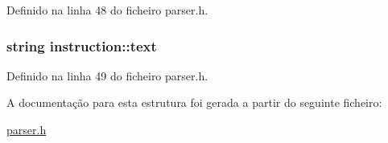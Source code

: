 Definido na linha 48 do ficheiro parser.\-h.

\hypertarget{structinstruction_af31af10ecfe7d2fdf154616d0aede8ea}{
\subsubsection[{text}]{\setlength{\rightskip}{0pt plus 5cm}string instruction\-::text}}\label{structinstruction_af31af10ecfe7d2fdf154616d0aede8ea}


Definido na linha 49 do ficheiro parser.\-h.



A documentação para esta estrutura foi gerada a partir do seguinte ficheiro\-:\begin{DoxyCompactItemize}
\item 
\hyperlink{parser_8h}{parser.\-h}\end{DoxyCompactItemize}
